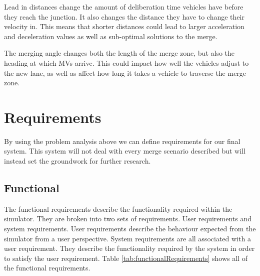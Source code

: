 Lead in distances change the amount of deliberation time vehicles have before they reach the junction. It also changes the distance they have to change their velocity in. This means that shorter distances could lead to larger acceleration and deceleration values as well as sub-optimal solutions to the merge. 

The merging angle changes both the length of the merge zone, but also the heading at which MVs arrive. This could impact how well the vehicles adjust to the new lane, as well as affect how long it takes a vehicle to traverse the merge zone.

\section{Requirements}
\label{sec:Requirements}
By using the problem analysis above we can define requirements for our final system. This system will not deal with every merge scenario described but will instead set the groundwork for further research.

\subsection{Functional}
\label{subsec:Functional}
The functional requirements describe the functionality required within the simulator. They are broken into two sets of requirements. User requirements and system requirements. User requirements describe the behaviour expected from the simulator from a user perspective. System requirements are all associated with a user requirement. They describe the functionality required by the system in order to satisfy the user requirement. Table \ref{tab:functionalRequirements} shows all of the functional requirements.

